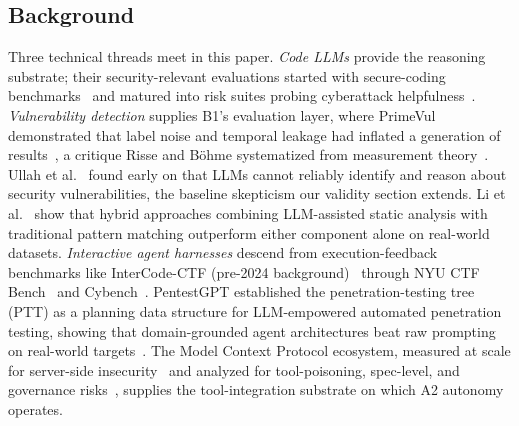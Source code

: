 \documentclass[conference,compsoc]{IEEEtran}
\begin{document}
\subsection{Background}
Three technical threads meet in this paper. \emph{Code LLMs} provide the reasoning substrate;
their security-relevant evaluations started with secure-coding benchmarks~\cite{csev12023bg} and
matured into risk suites probing cyberattack helpfulness~\cite{csev22024,csev32024}.
\emph{Vulnerability detection} supplies B1's evaluation layer, where PrimeVul demonstrated that
label noise and temporal leakage had inflated a generation of results~\cite{primevul2024},
a critique Risse and B\"ohme systematized from measurement theory~\cite{rissebohme-wrongexam2024}. Ullah et
al.~\cite{secllmholmes2025} found early on that LLMs cannot reliably identify and reason about
security vulnerabilities, the baseline skepticism our validity section extends. Li et
al.~\cite{iris2025} show that hybrid approaches combining LLM-assisted static analysis with
traditional pattern matching outperform either component alone on real-world datasets.
\emph{Interactive agent harnesses} descend from execution-feedback benchmarks like InterCode-CTF
(pre-2024 background)~\cite{intercode2023} through NYU CTF Bench~\cite{nyuctfbench2024} and
Cybench~\cite{cybench2024}. PentestGPT established the penetration-testing tree (PTT) as a
planning data structure for LLM-empowered automated penetration testing, showing that
domain-grounded agent architectures beat raw prompting on real-world
targets~\cite{pentestgpt2024}. The Model Context Protocol ecosystem, measured at
scale for server-side insecurity~\cite{mcpfirstlook2025} and analyzed for tool-poisoning,
spec-level, and governance risks~\cite{mcppoisoning2026,mcpspec2026,mcpgovernance2025}, supplies
the tool-integration substrate on which A2 autonomy operates.
\end{document}
